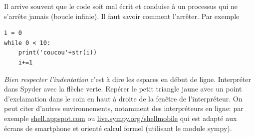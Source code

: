 Il arrive souvent que le code soit mal écrit et conduise à un processus qui ne s'arrête jamais (boucle infinie). Il faut savoir comment l'arrêter.
Par exemple
 \begin{verbatim}
i = 0
while 0 < 10:
    print('coucou'+str(i))
    i+=1
 \end{verbatim}
\emph{Bien respecter l'indentation} c'est à dire les espaces en début de ligne. Interpréter dans Spyder avec la flèche verte. Repérer le petit triangle jaune avec un point d'exclamation dans le coin en haut à droite de la fenêtre de l'interpréteur.
On peut citer d'autres environnements, notamment des interpréteurs en ligne: par exemple \href{http://shell.appspot.com}{shell.appspot.com} ou \href{http://live.sympy.org/shellmobile}{live.sympy.org/shellmobile} qui est adapté aux écrans de smartphone et orienté calcul formel  (utilisant le module sympy). 